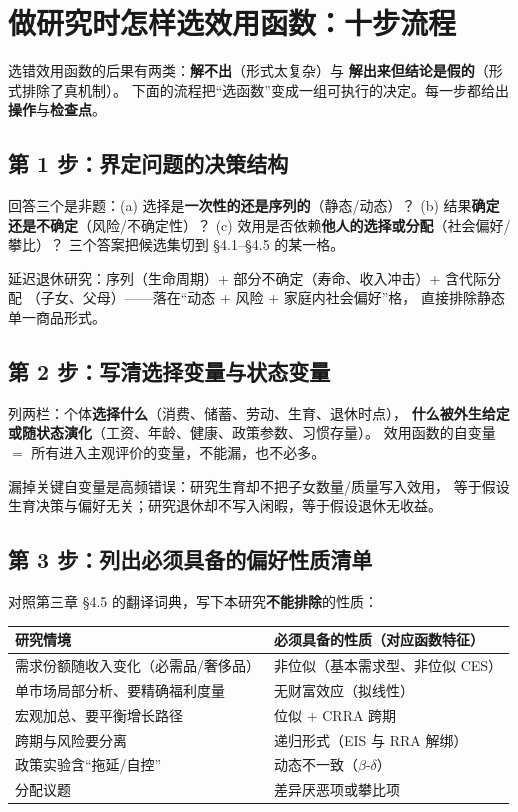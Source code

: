 \section{做研究时怎样选效用函数：十步流程}

选错效用函数的后果有两类：\textbf{解不出}（形式太复杂）与
\textbf{解出来但结论是假的}（形式排除了真机制）。
下面的流程把“选函数”变成一组可执行的决定。每一步都给出
\textbf{操作}与\textbf{检查点}。

\subsection{第 1 步：界定问题的决策结构}

回答三个是非题：(a) 选择是\textbf{一次性的还是序列的}（静态/动态）？
(b) 结果\textbf{确定还是不确定}（风险/不确定性）？
(c) 效用是否依赖\textbf{他人的选择或分配}（社会偏好/攀比）？
三个答案把候选集切到 §4.1--§4.5 的某一格。

延迟退休研究：序列（生命周期）+ 部分不确定（寿命、收入冲击）+ 含代际分配
（子女、父母）——落在“动态 + 风险 + 家庭内社会偏好”格，
直接排除静态单一商品形式。

\subsection{第 2 步：写清选择变量与状态变量}

列两栏：个体\textbf{选择什么}（消费、储蓄、劳动、生育、退休时点），
\textbf{什么被外生给定或随状态演化}（工资、年龄、健康、政策参数、习惯存量）。
效用函数的自变量 $=$ 所有进入主观评价的变量，不能漏，也不必多。

漏掉关键自变量是高频错误：研究生育却不把子女数量/质量写入效用，
等于假设生育决策与偏好无关；研究退休却不写入闲暇，等于假设退休无收益。

\subsection{第 3 步：列出必须具备的偏好性质清单}

对照第三章 §4.5 的翻译词典，写下本研究\textbf{不能排除}的性质：
\begin{center}
\small
\begin{tabular}{ll}
\toprule
研究情境 & 必须具备的性质（对应函数特征） \\
\midrule
需求份额随收入变化（必需品/奢侈品） & 非位似（基本需求型、非位似 CES） \\
单市场局部分析、要精确福利度量 & 无财富效应（拟线性） \\
宏观加总、要平衡增长路径 & 位似 + CRRA 跨期 \\
跨期与风险要分离 & 递归形式（EIS 与 RRA 解绑） \\
政策实验含“拖延/自控” & 动态不一致（$\beta$-$\delta$） \\
分配议题 & 差异厌恶项或攀比项 \\
\bottomrule
\end{tabular}
\end{center}

